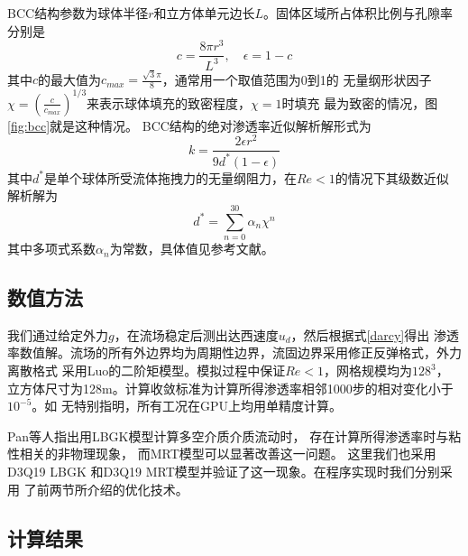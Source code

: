 BCC结构参数为球体半径$r$和立方体单元边长$L$。固体区域所占体积比例与孔隙率分别是
\begin{equation}
  c=\frac{8\pi r^3}{L^3}, \quad \epsilon = 1-c
  \label{bcc_c}
\end{equation}
其中$c$的最大值为$c_{max} = \frac{\sqrt{3}\pi}{8}$，通常用一个取值范围为0到1的
无量纲形状因子$\chi = \left(\frac{c}{c_{max}}\right)^{1/3}$来表示球体填充的致密程度，$\chi=1$时填充
最为致密的情况，图\ref{fig:bcc}就是这种情况。
BCC结构的绝对渗透率近似解析解形式为
\begin{equation}
  k = \frac{2\epsilon r^2}{9d^*(1-\epsilon)}
  \label{k_ana}
\end{equation}
其中$d^*$是单个球体所受流体拖拽力的无量纲阻力，在$Re<1$的情况下其级数近似
解析解为
\begin{equation}
  d^* = \sum\limits_{n=0}^{30}\alpha_n\chi^n
  \label{d_star}
\end{equation}
其中多项式系数$\alpha_n$为常数，具体值见参考文献\cite{sangani1982slow}。

\subsection{数值方法}
我们通过给定外力$g$，在流场稳定后测出达西速度$u_d$，然后根据式\eqref{darcy}得出
渗透率数值解。流场的所有外边界均为周期性边界，流固边界采用修正反弹格式，外力离散格式
采用Luo的二阶矩模型。模拟过程中保证$Re < 1$，网格规模均为$128^3$，
立方体尺寸为128m。计算收敛标准为计算所得渗透率相邻1000步的相对变化小于$10^{-5}$。如
无特别指明，所有工况在GPU上均用单精度计算。

Pan等人指出用LBGK模型计算多空介质介质流动时，
存在计算所得渗透率时与粘性相关的非物理现象，
而MRT模型可以显著改善这一问题。
这里我们也采用D3Q19 LBGK 和D3Q19 MRT模型并验证了这一现象。在程序实现时我们分别采用
了前两节所介绍的优化技术。

\subsection{计算结果}
